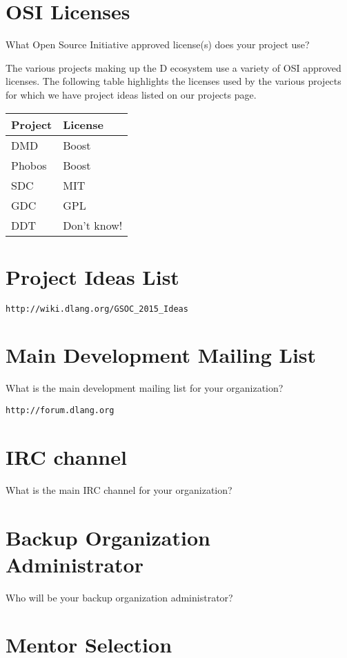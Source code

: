 \documentclass[a4paper,12pt]{article}
\begin{document}
\section{OSI Licenses}

What Open Source Initiative approved license(s) does your project use?

The various projects making up the D ecosystem use a variety of OSI approved
licenses.  The following table highlights the licenses used by the various projects
for which we have project ideas listed on our projects page.

\begin{center}
   \begin{tabular}{ | l | l | }
     \hline
     \textbf{Project} & \textbf{License} \\ \hline
     DMD & Boost \\
     Phobos & Boost \\
     SDC & MIT \\
     GDC & GPL \\
     DDT & Don't know!  \\ \hline
   \end{tabular}
\end{center}


\section{Project Ideas List}

\texttt{http://wiki.dlang.org/GSOC\_2015\_Ideas}

\section{Main Development Mailing List}
What is the main development mailing list for your organization?

\texttt{http://forum.dlang.org}

\section{IRC channel}
What is the main IRC channel for your organization?

\section{Backup Organization Administrator}
Who will be your backup organization administrator?

\section{Mentor Selection}
\end{document}
